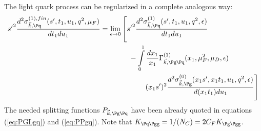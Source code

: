 The light quark process can be regularized in a complete analogous way:
\begin{align}
{s'}^2\frac{d^2\sigma_{\vec k,\Pq}^{(1),fin}(s',t_1,u_1,q^2,\mu_F)}{dt_1du_1} &= \lim_{\epsilon\rightarrow 0}\left[{s'}^2\frac{d^2\sigma_{\vec k,\Pq}^{(1)}(s',t_1,u_1,q^2,\epsilon)}{dt_1du_1} \right.\nonumber\\
 &\hspace{40pt}-\int\limits_0^1\frac{dx_1}{x_1}\Gamma_{\vec k,\Pg\Pq}^{(1)}(x_1,\mu_F^2,\mu_D,\epsilon)\nonumber\\
 &\hspace{60pt}\left.(x_1s')^2\frac{d^2\sigma_{\vec k,\Pg}^{(0)}(x_1s',x_1t_1,u_1,q^2,\epsilon)}{d(x_1t_1)du_1} \right] \label{eq:qMassFact}
\end{align}
The needed splitting functions $P_{\vec k,\Pg\Pq}$ have been already quoted in equations (\ref{eq:PGLgq}) and (\ref{eq:PPgq}). Note that $K_{\Pq\Pgg} = 1/(N_C) = 2C_FK_{\Pg\Pgg}$.


